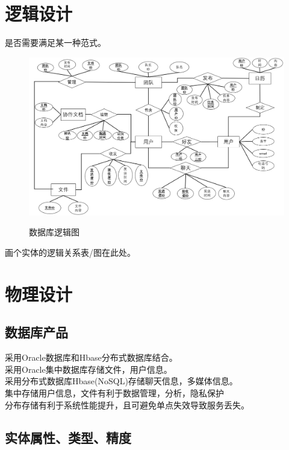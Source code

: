 \section{逻辑设计}
是否需要满足某一种范式。
        \begin{figure}[ht]
            \centering
            \includegraphics[scale =0.6]{数据库.png}\label{tab:classification}
            \caption{数据库逻辑图}\label{fig:noted-figure}
        \end{figure}
        \newpage
画个实体的逻辑关系表/图在此处。

\section{物理设计}
\subsection{数据库产品}
采用Oracle数据库和Hbase分布式数据库结合。\\
采用Oracle集中数据库存储文件，用户信息。\\
采用分布式数据库Hbase(NoSQL)存储聊天信息，多媒体信息。\\

集中存储用户信息，文件有利于数据管理，分析，隐私保护\\
分布存储有利于系统性能提升，且可避免单点失效导致服务丢失。\\

\subsection{实体属性、类型、精度}
